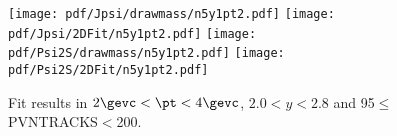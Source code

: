 \begin{figure}[H]
\begin{center}
\texttt{[image: pdf/Jpsi/drawmass/n5y1pt2.pdf]}
\texttt{[image: pdf/Jpsi/2DFit/n5y1pt2.pdf]}
\vspace*{-0.5cm}
\texttt{[image: pdf/Psi2S/drawmass/n5y1pt2.pdf]}
\texttt{[image: pdf/Psi2S/2DFit/n5y1pt2.pdf]}
\vspace*{-0.5cm}
\end{center}
\caption{Fit results in $2\gevc<\pt<4\gevc$, $2.0<y<2.8$ and 95$\leq$PVNTRACKS$<$200.}
\label{Fitn5y1pt2}
\end{figure}
